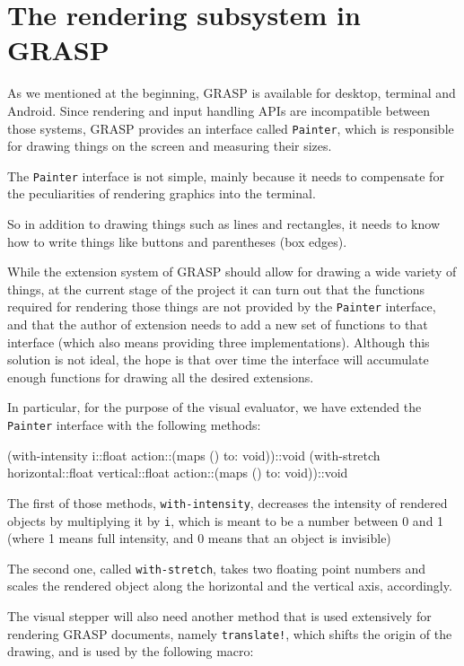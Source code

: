 \documentclass[acmsmall]{acmart}
\newenvironment{Snippet}{\Verbatim[samepage=true]}{\endVerbatim}
\begin{document}
\section{The rendering subsystem in GRASP}

As we mentioned at the beginning, GRASP is available for desktop, terminal
and Android. Since rendering and input handling APIs are incompatible
between those systems, GRASP provides an interface called \texttt{Painter},
which is responsible for drawing things on the screen and measuring their
sizes.

The \texttt{Painter} interface is not simple, mainly because it needs
to compensate for the peculiarities of rendering graphics into the
terminal.

So in addition to drawing things such as lines and rectangles, it
needs to know how to write things like buttons and parentheses (box
edges).

While the extension system of GRASP should allow for drawing a wide
variety of things, at the current stage of the project it can turn out
that the functions required for rendering those things are not
provided by the \texttt{Painter} interface, and that the author of
extension needs to add a new set of functions to that interface (which
also means providing three implementations). Although this solution is
not ideal, the hope is that over time the interface will accumulate
enough functions for drawing all the desired extensions.

In particular, for the purpose of the visual evaluator, we have
extended the \texttt{Painter} interface with the following methods:

\begin{Snippet}
(with-intensity i::float action::(maps () to: void))::void
(with-stretch horizontal::float vertical::float action::(maps () to: void))::void
\end{Snippet}

The first of those methods, \texttt{with-intensity}, decreases the
intensity of rendered objects by multiplying it by \texttt{i}, which
is meant to be a number between 0 and 1 (where 1 means full intensity,
and 0 means that an object is invisible)

The second one, called \texttt{with-stretch}, takes two floating point
numbers and scales the rendered object along the horizontal and the
vertical axis, accordingly.

The visual stepper will also need another method that is used
extensively for rendering GRASP documents, namely \texttt{translate!},
which shifts the origin of the drawing, and is used by the following
macro:
\end{document}
